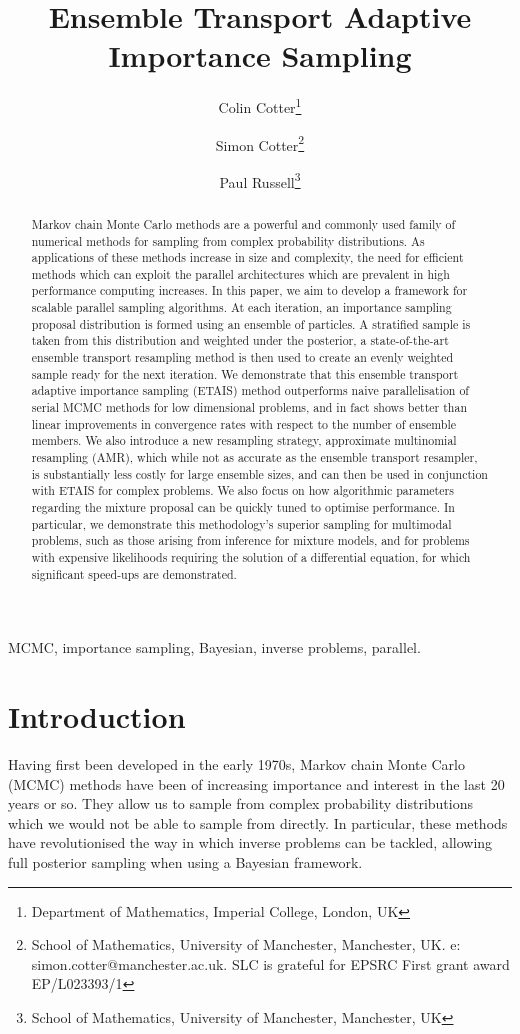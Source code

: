 \documentclass[final]{siamltex}
\author{Colin Cotter\thanks{Department of Mathematics, Imperial
    College, London, UK} \and Simon Cotter\thanks{School of
    Mathematics, University of Manchester, Manchester, UK. e:
    simon.cotter@manchester.ac.uk. SLC is grateful for EPSRC First
    grant award EP/L023393/1} \and Paul Russell\thanks{School of
    Mathematics, University of Manchester, Manchester, UK}}
\title{Ensemble Transport Adaptive Importance Sampling}
\begin{document}
\maketitle
\begin{abstract}
Markov chain Monte Carlo methods are a powerful and commonly used
  family of numerical methods for sampling from complex probability
  distributions. As applications of these methods increase in size and
  complexity, the need for efficient methods which can exploit the
  parallel architectures which are prevalent in high performance
  computing increases. In this paper, we aim to develop a framework
  for scalable parallel sampling algorithms. At each iteration, an
  importance sampling proposal distribution is formed using an
  ensemble of particles. A stratified sample is taken from this
  distribution and weighted under the posterior, a state-of-the-art
  ensemble transport resampling method is then used to create an evenly weighted sample
  ready for the next iteration. We demonstrate that this ensemble transport
  adaptive importance sampling (ETAIS) method outperforms naive
  parallelisation of serial MCMC methods for low dimensional problems,
  and in fact shows
  better than linear improvements in convergence rates with respect to
  the number of ensemble members. We also introduce a new resampling
  strategy, approximate multinomial resampling (AMR), which while not
  as accurate as the ensemble transport resampler, is substantially less costly for large
  ensemble sizes, and can then be used in conjunction with ETAIS for
  complex problems. We also focus on how algorithmic parameters
  regarding the mixture proposal can be quickly tuned to optimise
  performance. In particular, we demonstrate this methodology's
  superior sampling for multimodal problems, such as those arising
  from inference for mixture models, and for problems with expensive
  likelihoods requiring the solution of a differential equation, for
  which significant speed-ups are demonstrated.
\end{abstract}
\begin{keywords}MCMC, importance sampling, Bayesian, inverse problems,
  parallel.
\end{keywords}
\section{Introduction}
Having first been developed in the early 1970s\cite{hastings1970monte}, Markov chain Monte Carlo (MCMC) methods have been of increasing
importance and interest in the last 20 years or so. They allow us to
sample from complex probability distributions which we would not be
able to sample from directly. In particular, these methods have
revolutionised the way in which inverse problems can be tackled,
allowing full posterior sampling when using a Bayesian framework. 
\end{document}
